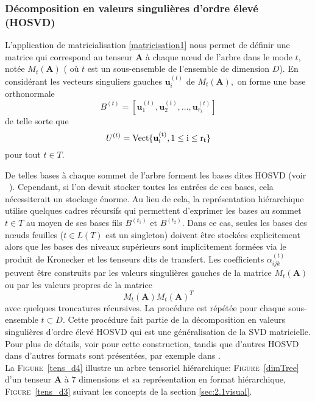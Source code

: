\documentclass[11pt,a4paper,oneside]{book}
\def\spam{\rm Vect}
\newcommand{\mbf}[1]{\mathbf{#1}}
\newcommand{\figref}[1]{\textsc{Figure}~\ref{#1}}
\begin{document}
\subsubsection*{Décomposition en valeurs singulières d'ordre élevé (HOSVD)}
%

L'application de matricialisation \eqref{matricisation1} nous permet de définir une matrice qui correspond au tenseur $\mathbf{A}$ à chaque nœud de l'arbre dans le mode $ t $, notée $M_t(\mathbf{A})$ ( où $ t $ est un sous-ensemble de l'ensemble de dimension $ D $). En considérant les vecteurs singuliers gauches $\mbf{u}_i^{(t)}$ de $M_t(\mathbf{A}),$ on forme une base orthonormale
$$B^{(t)} = [\mbf{u}_1^{(t)},\mbf{u}_2^{(t)},\ldots,\mbf{u}_{r_t}^{(t)}]$$
de telle sorte que $$U^{(t)} = \spam\{\mbf{u}_i^{(t)}, 1 \leq i \leq r_t\}$$ pour tout $t \in T$.

 De telles bases à chaque sommet de l'arbre forment les bases dites HOSVD (voir ~\cite[p.339]{hackbusch2012tensor}). Cependant, si l'on devait stocker toutes les entrées de ces bases, cela nécessiterait un stockage énorme. Au lieu de cela, la représentation hiérarchique utilise quelques cadres récursifs qui permettent d'exprimer les bases 
 au sommet $t \in T$ au moyen de ses bases fils $B^{(t_1)}$ et $B^{(t_2)}$. Dans ce cas, seules les bases des nœuds feuilles ($t\in L(T)$ est un singleton) doivent être stockées explicitement alors que les bases des niveaux supérieurs sont implicitement formées via le produit de Kronecker et les tenseurs dits de transfert. Les coefficients $\alpha_{ijk}^{(t)}$ peuvent être construits par les valeurs singulières gauches de la matrice $M_t(\mathbf{A})$ ou par les valeurs propres de la matrice $$M_t(\mathbf{A})M_t(\mathbf{A})^T$$
 avec quelques troncatures récursives. La procédure est répétée pour chaque sous-ensemble $t \subset D$. Cette procédure fait partie de la décomposition en valeurs singulières d'ordre élevé HOSVD qui est une généralisation de la SVD matricielle. Pour plus de détails, voir  \cite[Chap.11]{hackbusch2012tensor} pour cette construction, tandis que d'autres HOSVD dans d'autres formats sont présentées, par exemple dans \cite{de2000multilinear}.\\
 La \figref{tens_d4} illustre un arbre tensoriel hiérarchique: \figref{dimTree} d'un tenseur $\mbf{A}$ à 7 dimensions et sa représentation en format hiérarchique, \figref{tens_d3} suivant les concepts de la section \ref{sec:2.1visual}.
 
\end{document}
